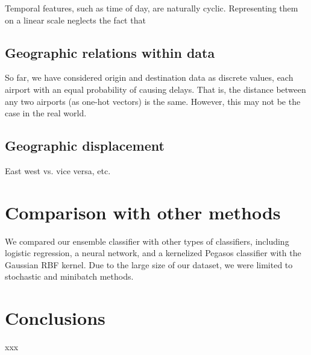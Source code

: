 \documentclass{article}
\begin{document}
\begin{multicols}{2}
Temporal features, such as time of day,
are naturally cyclic.
Representing them on a linear scale
neglects the fact that

\subsection{Geographic relations within data}

So far, we have considered origin and destination data
as discrete values,
each airport with an equal probability of causing delays.
That is, the distance between any two airports
(as one-hot vectors) is the same.
However, this may not be the case in the real world.

\subsection{Geographic displacement}

East west vs. vice versa, etc.

\section{Comparison with other methods}

We compared our ensemble classifier
with other types of classifiers,
including logistic regression, a neural network,
and a kernelized Pegasos classifier
with the Gaussian RBF kernel.
Due to the large size of our dataset,
we were limited to
stochastic and minibatch methods.

\section{Conclusions}

xxx

\end{multicols}
\end{document}
